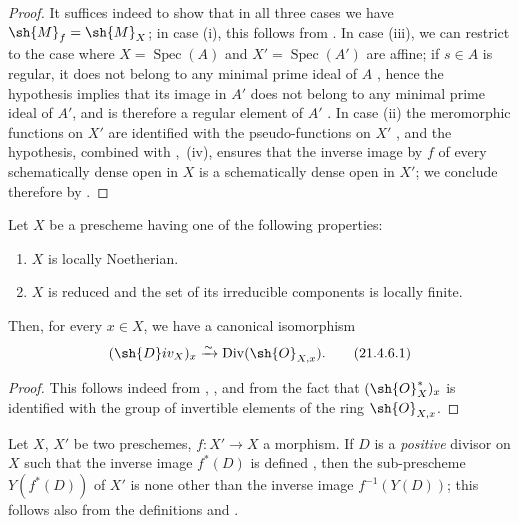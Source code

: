 \begin{proof}
It suffices indeed to show that in all three cases we have $\sh{M}_f=\sh{M}_X$;
in case (i), this follows from .
In case (iii), we can restrict to the case where $X=\operatorname{Spec}(A)$ and $X'=\operatorname{Spec}(A')$ are affine;
if $s\in A$ is regular, it does not belong to any minimal prime ideal of $A$ , hence the hypothesis implies that its image in $A'$ does not belong to any minimal prime ideal of $A'$, and is therefore a regular element of $A'$ .
In case (ii) the meromorphic functions on $X'$ are identified with the pseudo-functions on $X'$ , and the hypothesis, combined with ,~(iv), ensures that the inverse image
by $f$ of every schematically dense open in $X$ is a schematically dense open in $X'$;
we conclude therefore by .
\end{proof}

\begin{corollary}[21.4.6]
\label{IV.21.4.6}
Let $X$ be a prescheme having one of the following properties:
\begin{enumerate}[label=(\roman*)]
  \item $X$ is locally Noetherian.
  \item $X$ is reduced and the set of its irreducible components is locally finite.
\end{enumerate}
Then, for every $x\in X$, we have a canonical isomorphism
\[
\label{IV.21.4.6.1}
  (\sh{D}iv_X)_x\xrightarrow{\sim}\operatorname{Div}(\sh{O}_{X,x}).
  \tag{21.4.6.1}
\]
\end{corollary}

\begin{proof}
This follows indeed from , , and from the fact that $(\sh{O}_X^*)_x$ is identified with the group of invertible elements of the ring $\sh{O}_{X,x}$.
\end{proof}

\begin{env}[21.4.7]
\label{IV.21.4.7}
Let $X$, $X'$ be two preschemes, $f:X'\to X$ a morphism.
If $D$ is a \emph{positive} divisor on $X$ such that the inverse image $f^*(D)$ is defined , then the sub-prescheme $Y(f^*(D))$ of $X'$ is none other than the inverse image $f^{-1}(Y(D))$;
this follows also from the definitions  and .
\end{env}


